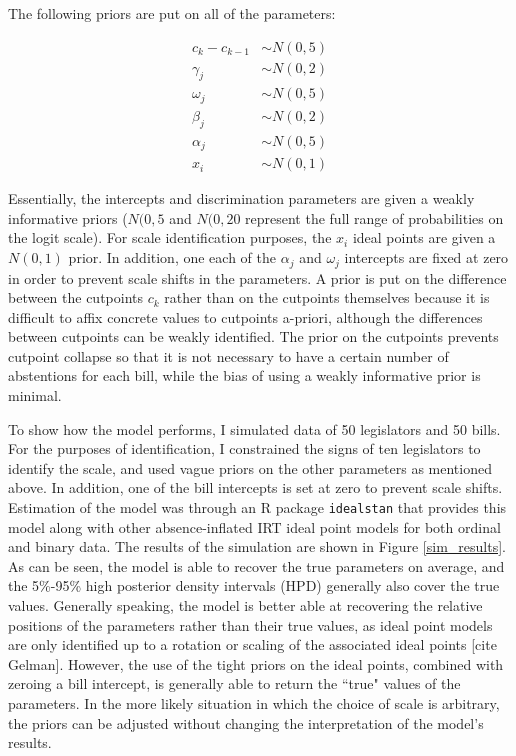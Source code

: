 	The following priors are put on all of the parameters:
	
	\begin{align*}
		c_k - c_{k-1} &\sim N(0,5)\\
		\gamma_j &\sim N(0,2)\\
		\omega_j &\sim N(0,5)\\
		\beta_j &\sim N(0,2)\\
		\alpha_j &\sim N(0,5)\\
		x_i &\sim N(0,1)
	\end{align*}

	
	Essentially, the intercepts and discrimination parameters are given a weakly informative priors ($N(0,5$ and $N(0,20$ represent the full range of probabilities on the logit scale). For scale identification purposes, the $x_i$ ideal points are given a $N(0,1)$ prior. In addition, one each of the $\alpha_j$ and $\omega_j$ intercepts are fixed at zero in order to prevent scale shifts in the parameters. A prior is put on the difference between the cutpoints $c_k$ rather than on the cutpoints themselves because it is difficult to affix concrete values to cutpoints a-priori, although the differences between cutpoints can be weakly identified. The prior on the cutpoints prevents cutpoint collapse so that it is not necessary to have a certain number of abstentions for each bill, while the bias of using a weakly informative prior is minimal.
	
	To show how the model performs, I simulated data of 50 legislators and 50 bills. For the purposes of identification, I constrained the signs of ten legislators to identify the scale, and used vague priors on the other parameters as mentioned above. In addition, one of the bill intercepts is set at zero to prevent scale shifts. Estimation of the model was through an R package \texttt{idealstan} that provides this model along with other absence-inflated IRT ideal point models for both ordinal and binary data. The results of the simulation are shown in Figure \ref{sim_results}. As can be seen, the model is able to recover the true parameters on average, and the 5\%-95\% high posterior density intervals (HPD) generally also cover the true values. Generally speaking, the model is better able at recovering the relative positions of the parameters rather than their true values, as ideal point models are only identified up to a rotation or scaling of the associated ideal points [cite Gelman]. However, the use of the tight priors on the ideal points, combined with zeroing a bill intercept, is generally able to return the ``true" values of the parameters. In the more likely situation in which the choice of scale is arbitrary, the priors can be adjusted without changing the interpretation of the model's results. 
	

